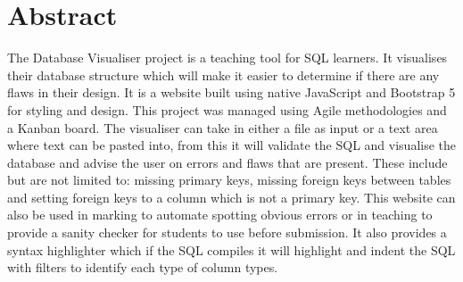 \thispagestyle{empty}

\section*{\centering Abstract}

The Database Visualiser project is a teaching tool for SQL learners. It visualises their database structure which will make it easier to determine if there are any flaws in their design. It is a website built using native JavaScript and Bootstrap 5 for styling and design. This project was managed using Agile methodologies and a Kanban board. The visualiser can take in either a file as input or a text area where text can be pasted into, from this it will validate the SQL and visualise the database and advise the user on errors and flaws that are present. These include but are not limited to: missing primary keys, missing foreign keys between tables and setting foreign keys to a column which is not a primary key. This website can also be used in marking to automate spotting obvious errors or in teaching to provide a sanity checker for students to use before submission. It also provides a syntax highlighter which if the SQL compiles it will highlight and indent the SQL with filters to identify each type of column types.

